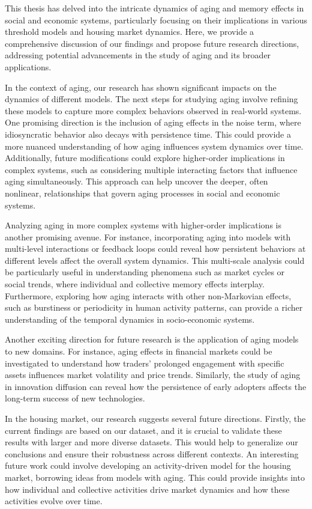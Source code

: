 This thesis has delved into the intricate dynamics of aging and memory effects in social and economic systems, particularly focusing on their implications in various threshold models and housing market dynamics. Here, we provide a comprehensive discussion of our findings and propose future research directions, addressing potential advancements in the study of aging and its broader applications.

In the context of aging, our research has shown significant impacts on the dynamics of different models. The next steps for studying aging involve refining these models to capture more complex behaviors observed in real-world systems. One promising direction is the inclusion of aging effects in the noise term, where idiosyncratic behavior also decays with persistence time. This could provide a more nuanced understanding of how aging influences system dynamics over time. Additionally, future modifications could explore higher-order implications in complex systems, such as considering multiple interacting factors that influence aging simultaneously. This approach can help uncover the deeper, often nonlinear, relationships that govern aging processes in social and economic systems.

Analyzing aging in more complex systems with higher-order implications is another promising avenue. For instance, incorporating aging into models with multi-level interactions or feedback loops could reveal how persistent behaviors at different levels affect the overall system dynamics. This multi-scale analysis could be particularly useful in understanding phenomena such as market cycles or social trends, where individual and collective memory effects interplay. Furthermore, exploring how aging interacts with other non-Markovian effects, such as burstiness or periodicity in human activity patterns, can provide a richer understanding of the temporal dynamics in socio-economic systems.

Another exciting direction for future research is the application of aging models to new domains. For instance, aging effects in financial markets could be investigated to understand how traders' prolonged engagement with specific assets influences market volatility and price trends. Similarly, the study of aging in innovation diffusion can reveal how the persistence of early adopters affects the long-term success of new technologies.

In the housing market, our research suggests several future directions. Firstly, the current findings are based on our dataset, and it is crucial to validate these results with larger and more diverse datasets. This would help to generalize our conclusions and ensure their robustness across different contexts. An interesting future work could involve developing an activity-driven model for the housing market, borrowing ideas from models with aging. This could provide insights into how individual and collective activities drive market dynamics and how these activities evolve over time.

